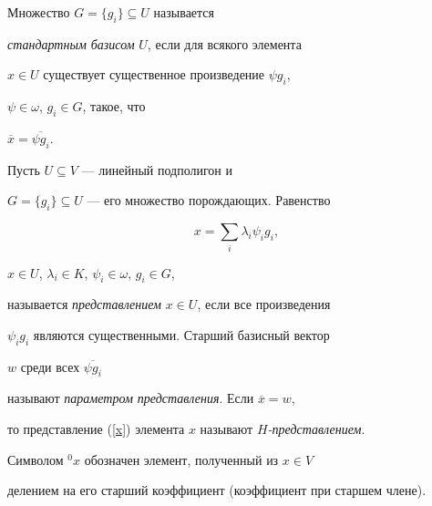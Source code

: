 \begin{defn}


Множество $G=\lbrace g_{i}\rbrace\subseteq U$ называется


{\it стандартным базисом} $U$, если для всякого элемента


$x\in U$ существует существенное произведение $\psi g_{i}$,


$\psi\in\omega$, $g_{i}\in G$, такое, что


$\overline{x}=\overline{\psi g_{i}}$.


\end{defn}





\begin{defn}


Пусть $U\subseteq V$ --- линейный подполигон и


$G=\lbrace g_{i}\rbrace\subseteq U$ --- его множество порождающих. Равенство


\begin{equation} \label{x}


x=\sum_{i}\lambda_{i}\psi_{i}g_{i},


\end{equation}


$x\in U$, $\lambda_{i}\in K$, $\psi_{i}\in\omega$, $g_{i}\in G$,


называется {\it представлением} $x\in U$, если все произведения


$\psi_{i}g_{i}$ являются существенными. Старший базисный вектор


$w$ среди всех $\overline{\psi g_{i}}$


называют {\it параметром представления}. Если $\overline{x}=w$,


то представление (\ref{x}) элемента $x$ называют {\it $H$-представлением}.


\end{defn}





Символом $^{0}x$ обозначен элемент, полученный из $x\in V$


делением на его старший коэффициент (коэффициент при старшем члене).









